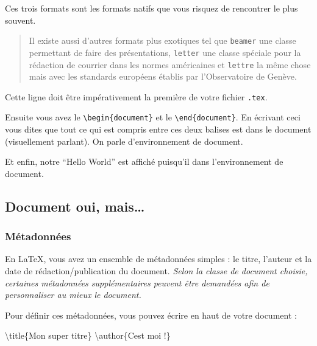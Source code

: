 \documentclass[A4paper
]{article}
\newenvironment{Shaded}{}{}
\newcommand{\FunctionTok}[1]{\textcolor[rgb]{0.02,0.16,0.49}{#1}}
\newcommand{\NormalTok}[1]{#1}
\begin{document}
Ces trois formats sont les formats natifs que vous risquez de rencontrer
le plus souvent.

\begin{quote}
Il existe aussi d'autres formats plus exotiques tel que \texttt{beamer}
une classe permettant de faire des présentations, \texttt{letter} une
classe spéciale pour la rédaction de courrier dans les normes
américaines et \texttt{lettre} la même chose mais avec les standards
européens établis par l'Observatoire de Genève.
\end{quote}

Cette ligne doit être impérativement la première de votre fichier
\texttt{.tex}.

Ensuite vous avez le \texttt{\textbackslash{}begin\{document\}} et le
\texttt{\textbackslash{}end\{document\}}. En écrivant ceci vous dites
que tout ce qui est compris entre ces deux balises est dans le document
(visuellement parlant). On parle d'environnement de document.

Et enfin, notre ``Hello World'' est affiché puisqu'il dans
l'environnement de document.

\hypertarget{document-oui-mais}{%
\subsection{Document oui, mais\ldots{}}\label{document-oui-mais}}

\hypertarget{muxe9tadonnuxe9es}{%
\subsubsection{Métadonnées}\label{muxe9tadonnuxe9es}}

En \LaTeX, vous avez un ensemble de métadonnées simples : le titre,
l'auteur et la date de rédaction/publication du document. \emph{Selon la
classe de document choisie, certaines métadonnées supplémentaires
peuvent être demandées afin de personnaliser au mieux le document.}

Pour définir ces métadonnées, vous pouvez écrire en haut de votre
document :

\begin{Shaded}
\begin{Highlighting}[]
\FunctionTok{\textbackslash{}title}\NormalTok{\{Mon super titre\}}
\FunctionTok{\textbackslash{}author}\NormalTok{\{C\textquotesingle{}est moi !\}}
\end{Highlighting}
\end{Shaded}
\end{document}
